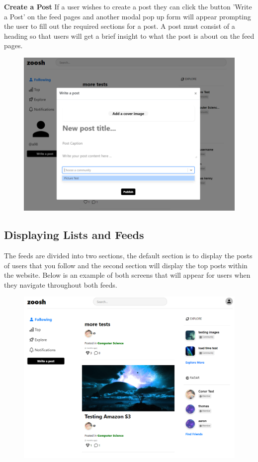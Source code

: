 \textbf{Create a Post}
\newline
If a user wishes to create a post they can click the button 'Write a Post' on the feed pages and another modal pop up form will appear prompting the user to fill out the required sections for a post. A post must consist of a heading so that users will get a brief insight to what the post is about on the feed pages. 

\begin{figure}[H]
  \centering
  \includegraphics[scale=0.35]{img/createpost.PNG}
  \label{fig:Create Post Modal.}
\end{figure}

\newpage
\subsection{Displaying Lists and Feeds}

The feeds are divided into two sections, the default section is to display the posts of users that you follow and the second section will display the top posts within the website. Below is an example of both screens that will appear for users when they navigate throughout both feeds.

\begin{figure}[H]
  \centering
  \includegraphics[scale=0.35]{img/following.PNG}
  \label{fig:Following Feed.}
\end{figure}

